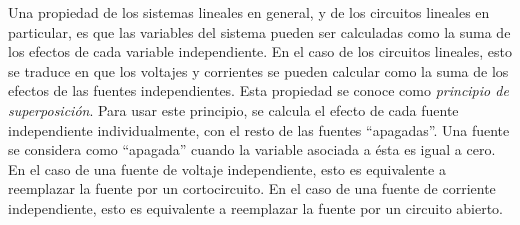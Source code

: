 \documentclass[paper=letter, fontsize=11pt]{scrartcl}
\begin{document}
Una propiedad de los sistemas lineales en general, y de los circuitos lineales
en particular, es que las variables del sistema pueden ser calculadas como la
suma de los efectos de cada variable independiente. En el caso de los circuitos
lineales, esto se traduce en que los voltajes y corrientes se pueden calcular
como la suma de los efectos de las fuentes independientes. Esta propiedad se
conoce como \emph{principio de superposición}. Para usar este principio, se
calcula el efecto de cada fuente independiente individualmente, con el resto de
las fuentes ``apagadas''. Una fuente se considera como ``apagada'' cuando la
variable asociada a ésta es igual a cero. En el caso de una fuente de voltaje
independiente, esto es equivalente a reemplazar la fuente por un
cortocircuito. En el caso de una fuente de corriente independiente, esto es
equivalente a reemplazar la fuente por un circuito abierto.
\end{document}
